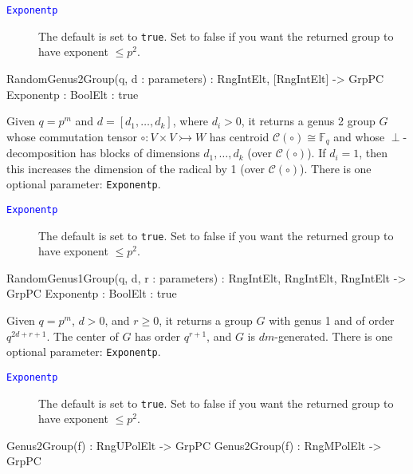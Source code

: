 \documentclass{documentation}
\begin{document}
\begin{description}
\item[\textcolor{blue}{\tt Exponentp}]
The default is set to {\tt true}.
Set to false if you want the returned group to have exponent $\leq p^2$.  
\end{description}

\begin{intrinsics}
RandomGenus2Group(q, d : parameters) : RngIntElt, [RngIntElt] -> GrpPC
    Exponentp : BoolElt : true
\end{intrinsics}

Given $q=p^m$ and $d=[d_1, \dots, d_k]$, where $d_i>0$, it returns a genus 2 group $G$ whose commutation tensor $\circ : V\times V\rightarrowtail W$ has centroid $\mathcal{C}(\circ)\cong \mathbb{F}_q$ and whose $\perp$-decomposition has blocks of dimensions $d_1,\dots,d_k$ (over $\mathcal{C}(\circ)$).
If $d_i=1$, then this increases the dimension of the radical by 1 (over $\mathcal{C}(\circ)$).
There is one optional parameter: {\tt Exponentp}. 

\begin{description}
\item[\textcolor{blue}{\tt Exponentp}]
The default is set to {\tt true}.
Set to false if you want the returned group to have exponent $\leq p^2$.  
\end{description}

\begin{intrinsics}
RandomGenus1Group(q, d, r : parameters) : RngIntElt, RngIntElt, RngIntElt -> GrpPC
    Exponentp : BoolElt : true
\end{intrinsics}

Given $q=p^m$, $d>0$, and $r\geq 0$, it returns a group $G$ with genus 1 and of order $q^{2d+r+1}$.
The center of $G$ has order $q^{r+1}$, and $G$ is $dm$-generated.
There is one optional parameter: {\tt Exponentp}. 

\begin{description}
\item[\textcolor{blue}{\tt Exponentp}]
The default is set to {\tt true}.
Set to false if you want the returned group to have exponent $\leq p^2$.  
\end{description}

\begin{intrinsics}
Genus2Group(f) : RngUPolElt -> GrpPC
Genus2Group(f) : RngMPolElt -> GrpPC
\end{intrinsics}
\end{document}
